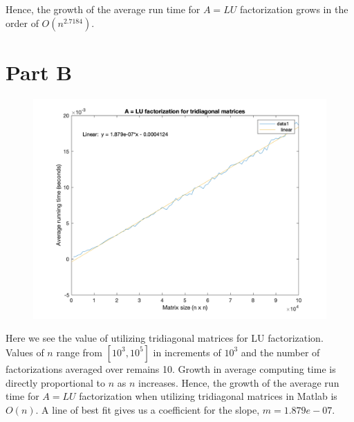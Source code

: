 \documentclass[11pt, oneside]{article}   	%
\begin{document}
Hence, the growth of the average run time for $A = LU$ factorization grows in the order of $O(n^{2.7184})$.

\section{Part B}
\begin{figure}
\centering
\includegraphics [scale=.19] {TriDiag_A_LU_Factorization_mean_running_times.png}
\end{figure}
Here we see the value of utilizing tridiagonal matrices for LU factorization. Values of $n$ range from $[10^3, 10^5]$ in increments of $10^3$  and the number of factorizations averaged over remains 10. Growth in average computing time is directly proportional to $n$ as $n$ increases. Hence, the growth of the average run time for $A = LU$ factorization when utilizing tridiagonal matrices in Matlab is $O(n)$. A line of best fit gives us a coefficient for the slope, $m = 1.879e-07$.


\end{document}

